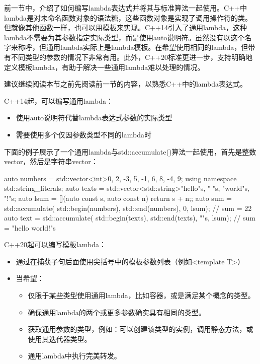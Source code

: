 
前一节中，介绍了如何编写lambda表达式并将其与标准算法一起使用。C++中lambda是对未命名函数对象的语法糖，这些函数对象是实现了调用操作符的类。但就像其他函数一样，也可以用模板来实现。C++14引入了通用lambda，这种lambda不需要为其参数指定实际类型，而是使用auto说明符。虽然没有以这个名字来称呼，但通用lambda实际上是lambda模板。在希望使用相同的lambda，但带有不同类型的参数的情况下非常有用。此外，C++20标准更进一步，支持明确地定义模板lambda，有助于解决一些通用lambda难以处理的情况。


建议继续阅读本节之前先阅读前一节的内容，以熟悉C++中的lambda表达式。


C++14起，可以编写通用lambda：

\begin{itemize}
\item
使用auto说明符代替lambda表达式参数的实际类型

\item
需要使用多个仅因参数类型不同的lambda时
\end{itemize}

下面的例子展示了一个通用lambda与std::accumulate()算法一起使用，首先是整数vector，然后是字符串vector：

\begin{cpp}
auto numbers =
    std::vector<int>{0, 2, -3, 5, -1, 6, 8, -4, 9};
using namespace std::string_literals;
auto texts =
    std::vector<std::string>{"hello"s, " "s, "world"s, "!"s};
auto lsum = [](auto const s, auto const n) {return s + n;};
auto sum = std::accumulate(
    std::begin(numbers), std::end(numbers), 0, lsum);
    // sum = 22
auto text = std::accumulate(
    std::begin(texts), std::end(texts), ""s, lsum);
    // sum = "hello world!"s
\end{cpp}

C++20起可以编写模板lambda：

\begin{itemize}
\item
通过在捕获子句后面使用尖括号中的模板参数列表（例如<template T>）

\item
当希望：

\begin{itemize}
\item
仅限于某些类型使用通用lambda，比如容器，或是满足某个概念的类型。

\item
确保通用lambda的两个或更多参数确实具有相同的类型。

\item
获取通用参数的类型，例如：可以创建该类型的实例，调用静态方法，或使用其迭代器类型。

\item
通用lambda中执行完美转发。
\end{itemize}
\end{itemize}

